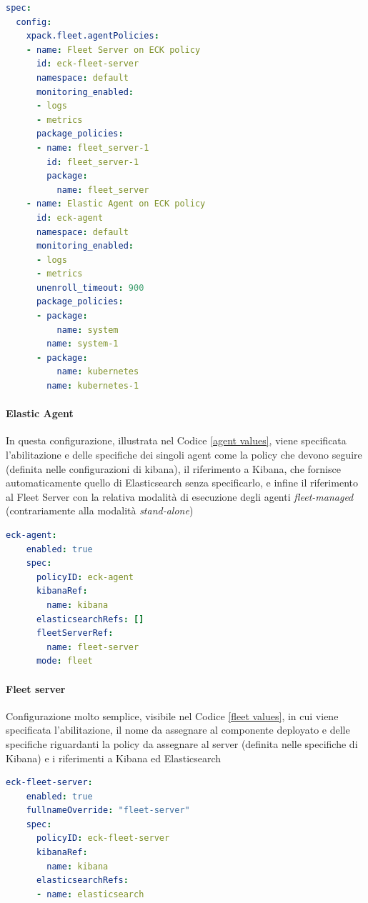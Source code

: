 \begin{lstlisting}[language=yaml, caption= Kibana Policy yaml values \label{kibana policy values}, basicstyle=\ttfamily]
spec:
  config:
    xpack.fleet.agentPolicies:
    - name: Fleet Server on ECK policy
      id: eck-fleet-server
      namespace: default
      monitoring_enabled:
      - logs
      - metrics
      package_policies:
      - name: fleet_server-1
        id: fleet_server-1
        package:
          name: fleet_server
    - name: Elastic Agent on ECK policy
      id: eck-agent
      namespace: default
      monitoring_enabled:
      - logs
      - metrics
      unenroll_timeout: 900
      package_policies:
      - package:
          name: system
        name: system-1
      - package:
          name: kubernetes
        name: kubernetes-1
\end{lstlisting}


\paragraph{Elastic Agent}
In questa configurazione, illustrata nel Codice \ref{agent values}, viene specificata l'abilitazione e delle specifiche dei singoli agent come la policy che devono seguire (definita nelle configurazioni di kibana), il riferimento a Kibana, che fornisce automaticamente quello di Elasticsearch senza specificarlo, e infine il riferimento al Fleet Server con la relativa modalità di esecuzione degli agenti \textit{fleet-managed} (contrariamente alla modalità \textit{stand-alone})
\begin{lstlisting}[language=yaml, caption= Elastic Agent yaml values \label{agent values}, basicstyle=\ttfamily]
  eck-agent:
    enabled: true
    spec:
      policyID: eck-agent
      kibanaRef:
        name: kibana
      elasticsearchRefs: []
      fleetServerRef:
        name: fleet-server
      mode: fleet
\end{lstlisting}

\paragraph{Fleet server}
Configurazione molto semplice, visibile nel Codice \ref{fleet values}, in cui viene specificata l'abilitazione, il nome da assegnare al componente deployato e delle specifiche riguardanti la policy da assegnare al server (definita nelle specifiche di Kibana) e i riferimenti a Kibana ed Elasticsearch
\begin{lstlisting}[language=yaml, caption= Fleet Server yaml values \label{fleet values}, basicstyle=\ttfamily]
  eck-fleet-server:
    enabled: true
    fullnameOverride: "fleet-server"
    spec:
      policyID: eck-fleet-server
      kibanaRef:
        name: kibana
      elasticsearchRefs:
      - name: elasticsearch
\end{lstlisting}

